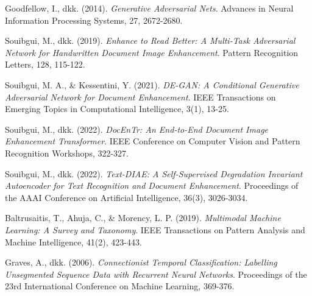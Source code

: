 

\begin{thebibliography}{99}
\setlength{\itemsep}{0.2cm}


Goodfellow, I., dkk. (2014).
\textit{Generative Adversarial Nets}.
Advances in Neural Information Processing Systems, 27, 2672-2680.

Souibgui, M., dkk. (2019).
\textit{Enhance to Read Better: A Multi-Task Adversarial Network for Handwritten Document Image Enhancement}.
Pattern Recognition Letters, 128, 115-122.

Souibgui, M. A., \& Kessentini, Y. (2021).
\textit{DE-GAN: A Conditional Generative Adversarial Network for Document Enhancement}.
IEEE Transactions on Emerging Topics in Computational Intelligence, 3(1), 13-25.

Souibgui, M., dkk. (2022).
\textit{DocEnTr: An End-to-End Document Image Enhancement Transformer}.
IEEE Conference on Computer Vision and Pattern Recognition Workshops, 322-327.

Souibgui, M., dkk. (2022).
\textit{Text-DIAE: A Self-Supervised Degradation Invariant Autoencoder for Text Recognition and Document Enhancement}.
Proceedings of the AAAI Conference on Artificial Intelligence, 36(3), 3026-3034.


Baltrusaitis, T., Ahuja, C., \& Morency, L. P. (2019).
\textit{Multimodal Machine Learning: A Survey and Taxonomy}.
IEEE Transactions on Pattern Analysis and Machine Intelligence, 41(2), 423-443.


Graves, A., dkk. (2006).
\textit{Connectionist Temporal Classification: Labelling Unsegmented Sequence Data with Recurrent Neural Networks}.
Proceedings of the 23rd International Conference on Machine Learning, 369-376.


\end{thebibliography}
